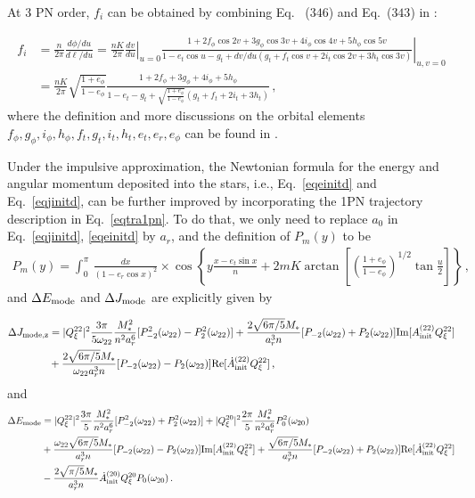 \documentclass[prd,aps,floatfix,superscriptaddress,nofootinbib,twocolumn,10pt,English]{revtex4}
\begin{document}
At 3 PN order, $f_i$ can be obtained by combining Eq.~ ($346$) and Eq.~($343$) in \cite{blanchet2014gravitational}:
\begin{widetext}
\begin{align}
f_i & =\frac{n}{2\pi}\frac{d \phi/d u}{d \ell/du} =\frac{n K}{2\pi} \left . \frac{dv}{du} \right |_{u=0} \left .\frac{1+2 f_\phi \cos 2v +3 g_\phi \cos 3 v + 4 i_\phi \cos 4 v +5 h_\phi \cos 5 v}{1-e_t \cos u-g_t+ dv/du(g_t+f_t \cos v+2 i_t \cos 2v+3 h_t \cos 3v)} \right |_{u,v=0} \nonumber \\
& = \frac{n K}{2 \pi} \sqrt{\frac{1+e_\phi}{1-e_\phi}} \frac{1+2 f_\phi  +3 g_\phi  + 4 i_\phi +5 h_\phi }{1-e_t -g_t+ \sqrt{\frac{1+e_\phi}{1-e_\phi}}(g_t+f_t +2 i_t +3 h_t )}\,,
\end{align}
where the definition and more discussions on the orbital elements  $f_\phi, g_\phi, i_\phi, h_\phi, f_t, g_t, i_t, h_t, e_t, e_r, e_\phi$ can be found in \cite{blanchet2014gravitational,memmesheimer2004third}.


Under the impulsive approximation, the Newtonian formula for the energy and angular momentum deposited into  the stars, i.e., Eq.~\eqref{eqeinitd} and Eq.~\eqref{eqjinitd}, can be further improved by incorporating the 1PN trajectory description in Eq.~\eqref{eqtra1pn}. To do that, we only need to replace $a_0$ in Eq.~\eqref{eqjinitd}, \eqref{eqeinitd} by $a_r$, and the definition of $P_m(y)$ to be
\begin{align}
P_{m}(y)  = \int^{ \pi}_0  \, \frac{dx}{(1-e_r \cos x)^2} 
 \times \cos {\left \{ y \frac{x -e_t \sin x}{n}+ 2 m K \arctan \left [ \left ( \frac{1+e_\phi}{1-e_\phi}\right )^{1/2} \tan \frac{u}{2}\right ]\right \} }\,,
\end{align}
and $\Delta E_{\rm mode}$ and $\Delta J_{\rm mode}$ are explicitly given by

\begin{align}\label{eqjinitpd}
 \Delta J_{\rm mode,z} &= |Q^{22}_\xi|^2 \frac{3 \pi}{5 \omega_{22}} \frac{M^2_*}{n^2 a^6_r}[P^2_{-2}(\omega_{22})-P^2_{2}(\omega_{22})]
+ \frac{2 \sqrt{6 \pi/5} M_*}{a^{3}_r n} [P_{-2}(\omega_{22})+P_{2}(\omega_{22})] {\rm Im}[A^{(22)}_{\rm init} Q^{22}_\xi] \nonumber \\
&+ \frac{2 \sqrt{6 \pi/5} M_*}{\omega_{22} a^{3}_r n} [P_{-2}(\omega_{22})-P_{2}(\omega_{22})] {\rm Re}[\dot{A}^{(22)}_{\rm init} Q^{22}_\xi] \,,
   \end{align}
and
 \begin{align}\label{eqeinitpd}
  \Delta E_{\rm mode} & = |Q^{22}_\xi|^2 \frac{3 \pi}{5} \frac{M^2_*}{n^2 a^6_r}[P^2_{-2}(\omega_{22})+P^2_{2}(\omega_{22})]
 +|Q^{20}_\xi|^2 \frac{2 \pi}{5 } \frac{M^2_*}{n^2 a^6_r} P^2_{0}(\omega_{20})\, \nonumber \\
 &+ \frac{ \omega_{22} \sqrt{6 \pi/5} M_*}{ a^{3}_r n} [P_{-2}(\omega_{22})-P_{2}(\omega_{22})] {\rm Im}[A^{(22)}_{\rm init} Q^{22}_\xi] 
 +\frac{ \sqrt{6 \pi/5} M_*}{ a^{3}_r n} [P_{-2}(\omega_{22})+P_{2}(\omega_{22})] {\rm Re}[\dot{A}^{(22)}_{\rm init} Q^{22}_\xi] \nonumber \\
 &- \frac{2\sqrt{\pi/5} M_*}{a^{3}_r n}\dot{A}^{(20)}_{\rm init} Q^{20}_\xi P_0(\omega_{20})\,.
      \end{align} 
      

\end{widetext}
\end{document}

